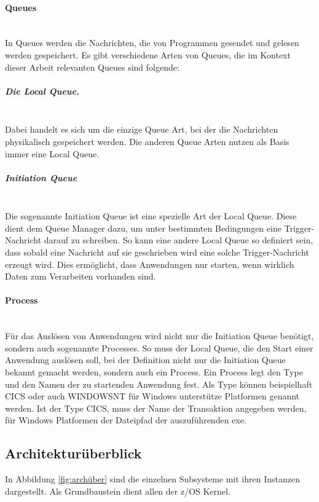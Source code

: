 \paragraph{Queues}~\\
In Queues werden die Nachrichten, die von Programmen gesendet und gelesen werden gespeichert.
Es gibt verschiedene Arten von Queues, die im Kontext dieser Arbeit relevanten Queues sind folgende:

\subparagraph{Die Local Queue.}~\\
Dabei handelt es sich um die einzige Queue Art, bei der die Nachrichten physikalisch gespeichert werden.
Die anderen Queue Arten nutzen als Basis immer eine Local Queue.

\subparagraph{Initiation Queue}~\\
Die sogenannte \glqq Initiation Queue\grqq{} ist eine spezielle Art der Local Queue.
Diese dient dem Queue Manager dazu, um unter bestimmten Bedingungen eine Trigger-Nachricht darauf zu schreiben.
So kann eine andere Local Queue so definiert sein, dass sobald eine Nachricht auf sie geschrieben wird eine solche Trigger-Nachricht erzeugt wird.
Dies ermöglicht, dass Anwendungen nur starten, wenn wirklich Daten zum Verarbeiten vorhanden sind.
\cite{Aranha.2013}

\paragraph{Process}~\\
Für das Auslösen von Anwendungen wird nicht nur die Initiation Queue benötigt, sondern auch sogenannte \glqq Processes\grqq.
So muss der Local Queue, die den Start einer Anwendung auslösen soll, bei der Definition nicht nur die Initiation Queue bekannt gemacht werden, sondern auch ein Process.
Ein Process legt den \glqq Type\grqq{} und den Namen der zu startenden Anwendung fest.
Als \glqq Type\grqq{} können beispielhaft CICS oder auch WINDOWSNT für Windows unterstütze Platformen genannt werden.
Ist der \glqq Type\grqq{} CICS,  muss der Name der Transaktion angegeben werden, für Windows Platformen der Dateipfad der auszuführenden exe.
\cite{Aranha.2013}

\subsection{Architekturüberblick}
In Abbildung \ref{fig:archüber} sind die einzelnen Subsysteme mit ihren Instanzen dargestellt.
Als Grundbaustein dient allen der z/OS Kernel.

